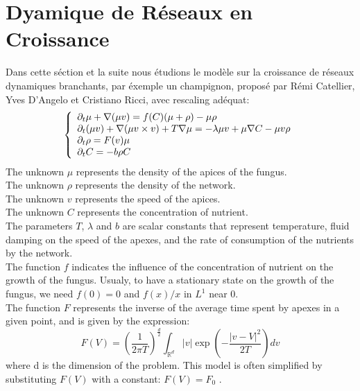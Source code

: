 \section{Dyamique de Réseaux en Croissance}
Dans cette séction et la suite nous étudions le modèle sur la croissance de réseaux dynamiques branchants, par éxemple un champignon, proposé par Rémi Catellier, Yves D'Angelo et Cristiano Ricci, avec rescaling adéquat:
\begin{equation}\label{eq:BDNG}  \left\{
                \begin{array}{ll}
                \partial_t\mu + \nabla(\mu v) = f(C)(\mu + \rho) -\mu\rho \\
                   \partial_t(\mu v)+\nabla(\mu v\times v) +T\nabla\mu=-\lambda\mu v+\mu\nabla C-\mu v \rho \\
                 \partial_t\rho=  F(v) \mu \\
                  \partial_t C = -b\rho C
                \end{array}
              \right.
\end{equation} 
The unknown $\mu$ represents the density of the apices of the fungus.\\ The unknown $\rho$ represents the density of the network.\\
The unknown $v$ represents the speed of the apices.\\
The unknown $C$ represents the concentration of nutrient.\\
The parameters $T$, $\lambda$ and $b$ are scalar constants that represent temperature, fluid damping on the speed of the apexes, and the rate of consumption of the nutrients by the network.\\
The function $f$ indicates the influence of the concentration of nutrient on the growth of the fungus. Usualy, to have a stationary state on the growth of the fungus, we need $f(0)=0$ and $f(x)/x$ in $L^1$ near 0.\\
The function $F$ represents the inverse of the average time spent by apexes in a given point, and is given by the expression:
\begin{equation}
	F(V)=(\frac{1}{2\pi T})^\frac{d}{2}\int_{\mathbb{R}^d} |v|\exp(-\frac{|v-V|^2}{2T})dv\end{equation}
where d is the dimension of the problem. This model is often simplified by substituting $F(V)$ with a constant: $F(V)= F_0$ .\\


